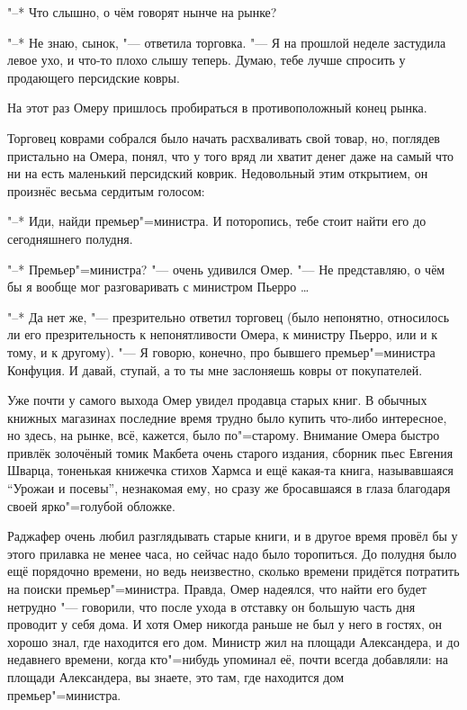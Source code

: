 "--* Что слышно, о чём говорят нынче на рынке?

"--* Не знаю, сынок, "--- ответила торговка.
"--- Я на прошлой неделе застудила левое ухо, и что-то плохо слышу теперь.
Думаю, тебе лучше спросить у продающего персидские ковры.

На этот раз Омеру пришлось пробираться в противоположный конец рынка.

Торговец коврами собрался было начать расхваливать свой товар, но, поглядев
пристально на Омера, понял, что у того вряд ли хватит денег даже на самый что ни
на есть маленький персидский коврик.
Недовольный этим открытием, он произнёс весьма сердитым голосом:

"--* Иди, найди премьер"=министра.
И поторопись, тебе стоит найти его до сегодняшнего полудня.

"--* Премьер"=министра? "--- очень удивился Омер.
"--- Не представляю, о чём бы я вообще мог разговаривать с министром
Пьерро \ldots

"--* Да нет же, "--- презрительно ответил торговец (было непонятно, относилось
ли его презрительность к непонятливости Омера, к министру Пьерро, или и к тому,
и к другому).
"--- Я говорю, конечно, про бывшего премьер"=министра Конфуция.
И давай, ступай, а то ты мне заслоняешь ковры от покупателей.

Уже почти у самого выхода Омер увидел продавца старых книг.
В обычных книжных магазинах последние время трудно было купить что-либо
интересное, но здесь, на рынке, всё, кажется, было по"=старому.
Внимание Омера быстро привлёк золочёный томик Макбета очень старого издания,
сборник пьес Евгения Шварца, тоненькая книжечка стихов Хармса и ещё какая-та
книга, называвшаяся \enquote{Урожаи и посевы}, незнакомая ему, но сразу же
бросавшаяся в глаза благодаря своей ярко"=голубой обложке.

Раджафер очень любил разглядывать старые книги, и в другое время провёл бы у
этого прилавка не менее часа, но сейчас надо было торопиться.
До полудня было ещё порядочно времени, но ведь неизвестно, сколько времени
придётся потратить на поиски премьер"=министра.
Правда, Омер надеялся, что найти его будет нетрудно "--- говорили, что после
ухода в отставку он большую часть дня проводит у себя дома.
И хотя Омер никогда раньше не был у него в гостях, он хорошо знал, где находится
его дом.
Министр жил на площади Александера, и до недавнего времени, когда кто"=нибудь
упоминал её, почти всегда добавляли: на площади Александера, вы знаете, это там,
где находится дом премьер"=министра.

